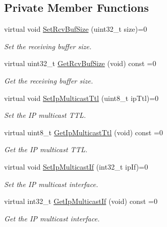\subsection*{Private Member Functions}
\begin{DoxyCompactItemize}
\item 
virtual void \hyperlink{classns3_1_1UdpSocket_a4d598f07e803641d6fa869c866caea44}{Set\+Rcv\+Buf\+Size} (uint32\+\_\+t size)=0
\begin{DoxyCompactList}\small\item\em Set the receiving buffer size. \end{DoxyCompactList}\item 
virtual uint32\+\_\+t \hyperlink{classns3_1_1UdpSocket_aa222c9c8a78b860f1bceafdd72b54ae0}{Get\+Rcv\+Buf\+Size} (void) const =0
\begin{DoxyCompactList}\small\item\em Get the receiving buffer size. \end{DoxyCompactList}\item 
virtual void \hyperlink{classns3_1_1UdpSocket_af62d9cab3ecae6be95c7c33850126889}{Set\+Ip\+Multicast\+Ttl} (uint8\+\_\+t ip\+Ttl)=0
\begin{DoxyCompactList}\small\item\em Set the IP multicast T\+TL. \end{DoxyCompactList}\item 
virtual uint8\+\_\+t \hyperlink{classns3_1_1UdpSocket_a2612696b076f094d3c76363e2e2b8d30}{Get\+Ip\+Multicast\+Ttl} (void) const =0
\begin{DoxyCompactList}\small\item\em Get the IP multicast T\+TL. \end{DoxyCompactList}\item 
virtual void \hyperlink{classns3_1_1UdpSocket_a20d595600406785f84dd3bd999b3dce4}{Set\+Ip\+Multicast\+If} (int32\+\_\+t ip\+If)=0
\begin{DoxyCompactList}\small\item\em Set the IP multicast interface. \end{DoxyCompactList}\item 
virtual int32\+\_\+t \hyperlink{classns3_1_1UdpSocket_a47d613ffaa57a41bbceb80e6f4ea05e3}{Get\+Ip\+Multicast\+If} (void) const =0
\begin{DoxyCompactList}\small\item\em Get the IP multicast interface. \end{DoxyCompactList}\item 

\end{DoxyCompactItemize}
